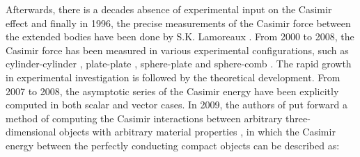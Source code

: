 Afterwards, there is a decades absence of experimental input on the Casimir effect and finally in 1996, the precise measurements of the Casimir force between 
the extended bodies have been done by S.K. Lamoreaux \cite{lamoreaux1997demonstration}. From 2000 to 2008, the Casimir force has been measured in various 
experimental configurations, such as cylinder-cylinder \cite{ederth2000template}, plate-plate \cite{bressi2002measurement}, 
sphere-plate \cite{krause2007experimental} and sphere-comb \cite{chan2008measurement}. The rapid growth in experimental investigation is followed by the 
theoretical development. From 2007 to 2008, the asymptotic series of the Casimir energy have been explicitly computed in both scalar
\cite{emig2008casimir} and vector \cite{emig2007casimir} cases. In 2009, the authors of \cite{reid2009efficient} put forward a method of computing the Casimir interactions between 
arbitrary three-dimensional objects with arbitrary material properties \cite{reid2009efficient}, in which the Casimir energy between the perfectly
conducting compact objects can be described as:

